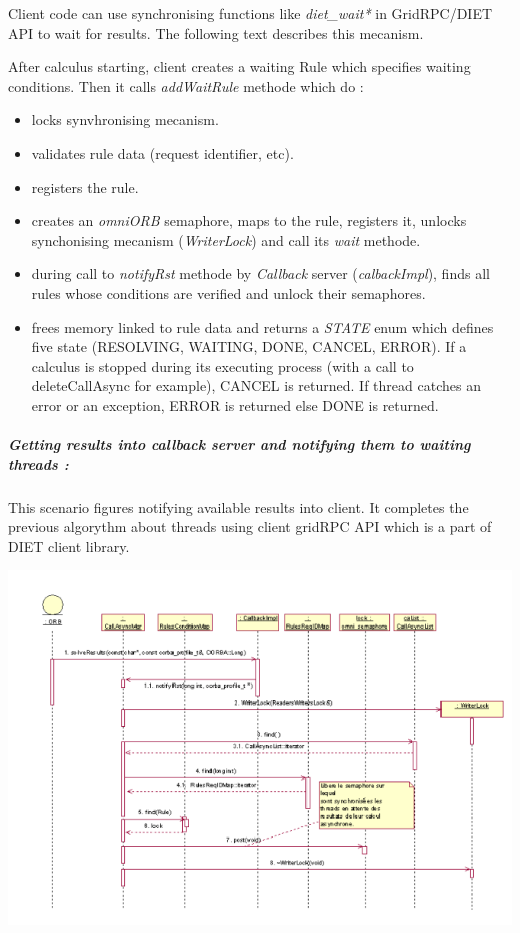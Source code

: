   Client code can use synchronising functions like \emph{diet\_wait*}
  in GridRPC/DIET API to wait for results. The following text describes
  this mecanism.

  After calculus starting, client creates a waiting Rule which specifies
  waiting conditions. Then it calls \emph{addWaitRule} methode which do :

  \begin{itemize}
  \item locks synvhronising mecanism.
  \item validates rule data (request identifier, etc).
  \item registers the rule.
  \item creates an \emph{omniORB}  semaphore, maps to the rule, registers it,
  unlocks synchonising mecanism (\emph{WriterLock}) and call its \emph{wait} methode.
  \item during call to \emph{notifyRst} methode by \emph{Callback} server
  (\emph{calbackImpl}), finds all rules whose conditions are verified
  and unlock their semaphores.
  \item frees memory linked to rule data and returns a \emph{STATE} enum
  which defines five state (RESOLVING, WAITING, DONE, CANCEL, ERROR). If
  a calculus is stopped during its executing process (with a call to deleteCallAsync for example),
  CANCEL is returned. If thread catches an error or an exception, ERROR is returned else DONE is returned.
  \end{itemize}


  \subparagraph{Getting results into callback server and notifying them to waiting threads :}
  This scenario figures notifying available results into client. It completes
  the previous algorythm about threads using client gridRPC API which is a
  part of DIET client library.

  \begin{center}
  \includegraphics{./fig/CallbackSynchronisationSequenceDiagram}
  \end{center}

